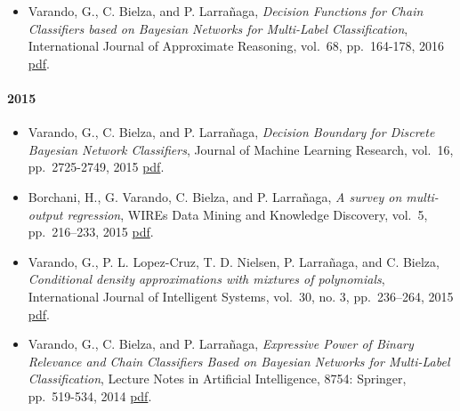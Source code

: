 \documentclass[]{article}
\providecommand{\tightlist}{%
  \setlength{\itemsep}{0pt}\setlength{\parskip}{0pt}}
\let\oldparagraph\paragraph
\renewcommand{\paragraph}[1]{\oldparagraph{#1}\mbox{}}
\begin{document}
\begin{itemize}
\tightlist
\item
  Varando, G., C. Bielza, and P. Larrañaga, \emph{Decision Functions for
  Chain Classifiers based on Bayesian Networks for Multi-Label
  Classification}, International Journal of Approximate Reasoning,
  vol.~68, pp.~164-178, 2016
  \href{https://www.sciencedirect.com/science/article/pii/S0888613X15000900}{pdf}.
\end{itemize}

\hypertarget{section-2}{%
\paragraph{2015}\label{section-2}}

\begin{itemize}
\tightlist
\item
  Varando, G., C. Bielza, and P. Larrañaga, \emph{Decision Boundary for
  Discrete Bayesian Network Classifiers}, Journal of Machine Learning
  Research, vol.~16, pp.~2725-2749, 2015
  \href{http://jmlr.csail.mit.edu/papers/volume16/varando15a/varando15a.pdf}{pdf}.
\item
  Borchani, H., G. Varando, C. Bielza, and P. Larrañaga, \emph{A survey
  on multi-output regression}, WIREs Data Mining and Knowledge
  Discovery, vol.~5, pp.~216--233, 2015
  \href{https://onlinelibrary.wiley.com/doi/full/10.1002/widm.1157}{pdf}.
\item
  Varando, G., P. L. Lopez-Cruz, T. D. Nielsen, P. Larrañaga, and C.
  Bielza, \emph{Conditional density approximations with mixtures of
  polynomials}, International Journal of Intelligent Systems, vol.~30,
  no. 3, pp.~236--264, 2015
  \href{https://onlinelibrary.wiley.com/doi/full/10.1002/int.21699}{pdf}.
\item
  Varando, G., C. Bielza, and P. Larrañaga, \emph{Expressive Power of
  Binary Relevance and Chain Classifiers Based on Bayesian Networks for
  Multi-Label Classification}, Lecture Notes in Artificial Intelligence,
  8754: Springer, pp.~519-534, 2014
  \href{https://link.springer.com/chapter/10.1007\%2F978-3-319-11433-0_34}{pdf}.
\end{itemize}
\end{document}
